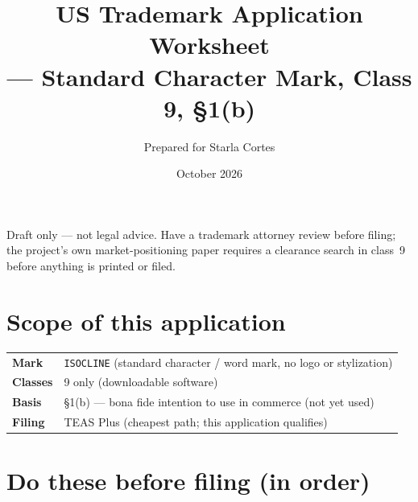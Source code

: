 \documentclass[11pt,a4paper]{article}
\title{\textbf{US Trademark Application Worksheet}\\[0.3em]
\large \name{Isocline} --- Standard Character Mark, Class 9, \S1(b)}
\author{Prepared for Starla Cortes}
\date{October 2026}
\newcommand{\code}[1]{\texttt{\small #1}}
\begin{document}
\maketitle

\noindent
Draft only --- not legal advice. Have a trademark attorney review before
filing; the project's own market-positioning paper requires a clearance search
in class~9 before anything is printed or filed.

\section{Scope of this application}

\begin{center}
\begin{tabular}{@{}ll@{}}
\toprule
\textbf{Mark}     & \code{ISOCLINE} (standard character / word mark, no logo or stylization) \\
\textbf{Classes}  & 9 only (downloadable software) \\
\textbf{Basis}    & \S1(b) --- bona fide intention to use in commerce (not yet used) \\
\textbf{Filing}   & TEAS Plus (cheapest path; this application qualifies) \\
\bottomrule
\end{tabular}
\end{center}

\section{Do these before filing (in order)}
\end{document}
